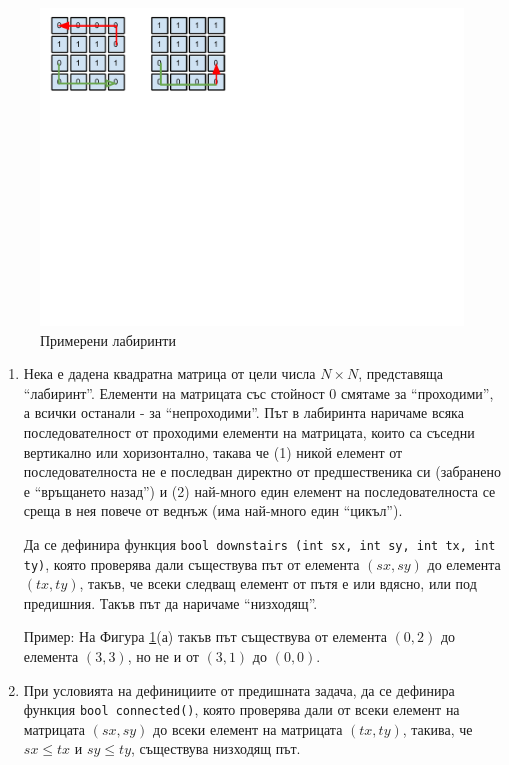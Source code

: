 {\begin{figure}
\includegraphics[width=15cm]{images/path1}
\vspace{-200px}
\caption{Примерени лабиринти}
\label{fig:samplelab}
\end{figure}


\begin{enumerate}[resume]

	\item \label{zad:labds} Нека е дадена квадратна матрица от цели числа $N \times N$, представяща ``лабиринт''. Елементи на матрицата със стойност $0$ смятаме за ``проходими'', а всички останали - за ``непроходими''. Път в лабиринта наричаме всяка последователност от проходими елементи на матрицата, които са съседни вертикално или хоризонтално, такава че (1) никой елемент от последователноста не е последван директно от предшественика си (забранено е ``връщането назад'') и (2) най-много един елемент на последователноста се среща в нея повече от веднъж (има най-много един ``цикъл'').

	Да се дефинира функция \texttt{bool downstairs (int sx, int sy, int tx, int ty)}, която проверява дали съществува път от елемента $(sx,sy)$ до елемента $(tx,ty)$, такъв, че всеки следващ елемент от пътя е или вдясно, или под предишния. Такъв път да наричаме ``низходящ''.

	Пример: На Фигура \ref{fig:samplelab}(а) такъв път съществува от елемента $(0,2)$ до елемента $(3,3)$, но не и от $(3,1)$ до $(0,0)$.

	\item При условията на дефинициите от предишната задача, да се дефинира функция \texttt{bool connected()}, която проверява дали от всеки елемент на матрицата $(sx,sy)$ до всеки елемент на матрицата  $(tx,ty)$, такива, че $sx \leq tx$ и $sy \leq ty$, съществува низходящ път.


\end{enumerate}}
